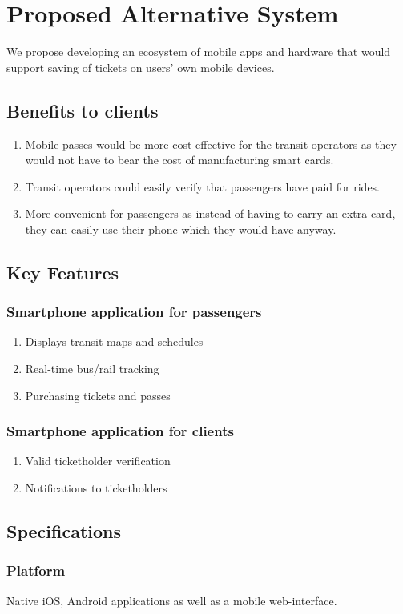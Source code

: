 \documentclass[]{article}
\begin{document}
\section{Proposed Alternative System}
	We propose developing an ecosystem of mobile apps and hardware that would support saving of tickets on users' own mobile devices.
	\subsection{Benefits to clients}
		\begin{enumerate}
			\item Mobile passes would be more cost-effective for the transit operators as they would not have to bear the cost of manufacturing smart cards.
			\item Transit operators could easily verify that passengers have paid for rides.
			\item More convenient for passengers as instead of having to carry an extra card, they can easily use their phone which they would have anyway.
		\end{enumerate}
	\subsection{Key Features}
		\subsubsection{Smartphone application for passengers}
			\begin{enumerate}
				\item Displays transit maps and schedules
				\item Real-time bus/rail tracking
				\item Purchasing tickets and passes
			\end{enumerate}
		\subsubsection{Smartphone application for clients}
			\begin{enumerate}
				\item Valid ticketholder verification
				\item Notifications to ticketholders
			\end{enumerate}
		\subsection{Specifications}
			\subsubsection{Platform}
				Native iOS, Android applications as well as a mobile web-interface.
\end{document}
